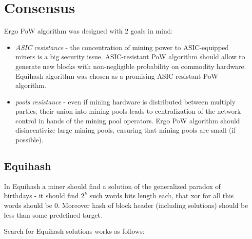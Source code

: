 \section{Consensus}


Ergo PoW algorithm was designed with 2 goals in mind:

\begin{itemize}
    \item{\em ASIC resistance } - the concentration of mining power to ASIC-equipped miners
    is a big security issue.
    ASIC-resistant PoW algorithm should allow to generate new blocks with non-negligible
    probability on commodity hardware.
    Equihash algorithm was chosen as a promising ASIC-resistant PoW algorithm.
    \item{\em pools resistance } - even if mining hardware is distributed between multiply parties,
    their union into mining pools leads to centralization of the network control in hands of the mining pool operators.
    Ergo PoW algorithm should disincentivize large mining pools, ensuring that mining pools are small (if possible).
\end{itemize}

\subsection{Equihash}

In Equihash a miner should find a solution of the generalized paradox of birthdays - it should find
$2^k$ such words  bits length each, that xor for all this words should be 0.
Moreover hash of block header (including solutions) should be less than some predefined target.

Search for Equihash solutions works as follows:

